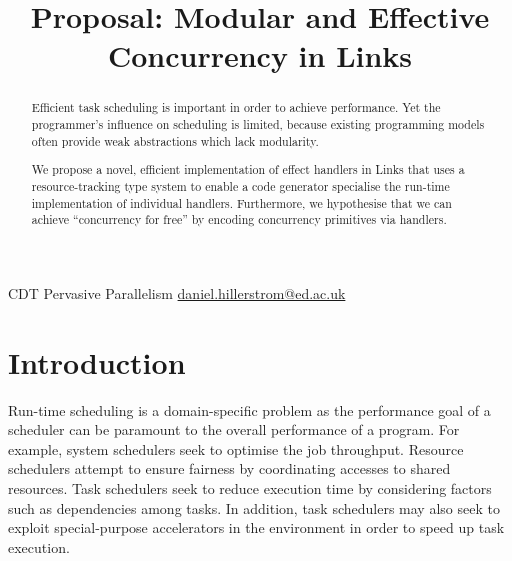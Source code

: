 \documentclass[preprint,10pt,numbers]{sigplanconf}
\begin{document}
\title{Proposal: Modular and Effective Concurrency in Links}

           {CDT Pervasive Parallelism}
           {\href{mailto:daniel.hillerstrom@ed.ac.uk}{daniel.hillerstrom@ed.ac.uk}}
  \maketitle
  \begin{abstract}
Efficient task scheduling is important in order to achieve performance. Yet the programmer's influence on scheduling is limited, because existing programming models often provide weak abstractions which lack modularity. 

We propose a novel, efficient implementation of effect handlers in Links that uses a resource-tracking type system to enable a code generator specialise the run-time implementation of individual handlers. Furthermore, we hypothesise that we can achieve ``concurrency for free'' by encoding concurrency primitives via handlers.
  \end{abstract}
  \section{Introduction}
Run-time scheduling is a domain-specific problem as the performance goal of a scheduler can be paramount to the overall performance of a program. For example, system schedulers seek to optimise the job throughput. Resource schedulers attempt to ensure fairness by coordinating accesses to shared resources. Task schedulers seek to reduce execution time by considering factors such as dependencies among tasks. In addition, task schedulers may also seek to exploit special-purpose accelerators in the environment in order to speed up task execution.


\end{document}

